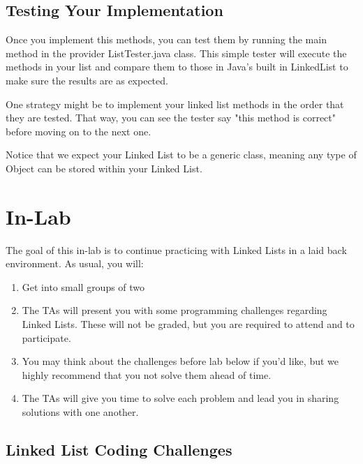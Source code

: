 \documentclass[paper=a4, fontsize=11pt, parskip=full]{scrartcl} %
\numberwithin{equation}{section} %
\numberwithin{figure}{section} %
\numberwithin{table}{section} %
\begin{document}
\subsection{Testing Your Implementation}

Once you implement this methods, you can test them by running the main method in the provider ListTester.java class. This simple tester will execute the methods in your list and compare them to those in Java's built in LinkedList to make sure the results are as expected.

One strategy might be to implement your linked list methods in the order that they are tested. That way, you can see the tester say "this method is correct" before moving on to the next one.

Notice that we expect your Linked List to be a generic class, meaning any type of Object can be stored within your Linked List.



\newpage
\section{In-Lab}

The goal of this in-lab is to continue practicing with Linked Lists in a laid back environment. As usual, you will:

\begin{enumerate}
	\item Get into small groups of two
	\item The TAs will present you with some programming challenges regarding Linked Lists. These will not be graded, but you are required to attend and to participate.
	\item You may think about the challenges before lab below if you'd like, but we highly recommend that you not solve them ahead of time.
	\item The TAs will give you time to solve each problem and lead you in sharing solutions with one another.
\end{enumerate}

\subsection{Linked List Coding Challenges}
\end{document}
